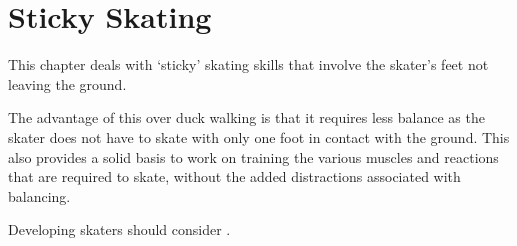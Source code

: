 \chapter{Sticky Skating}
\label{ch:sticky}


This chapter deals with `sticky' skating skills that involve the skater's feet not leaving the ground.


The advantage of this over duck walking is that it requires less balance as the skater does not have to skate with only one foot in contact with the ground.    
This also provides a solid basis to work on training the various muscles and reactions that are required to skate, without the added distractions associated with balancing.  


Developing skaters should consider .   
